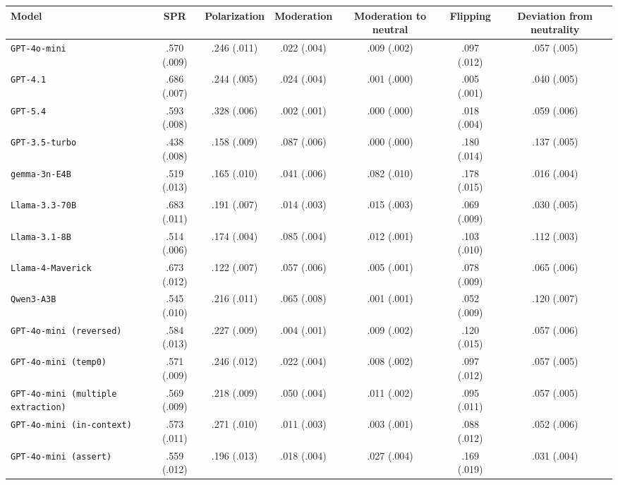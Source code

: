 \begin{tabular}{lcccccc}
		\\
		\hline
		Model & SPR & Polarization & Moderation & Moderation to neutral & Flipping & Deviation from neutrality \\
		\hline
		\texttt{GPT-4o-mini} & .570 (.009) & .246 (.011) & .022 (.004) & .009 (.002) & .097 (.012) & .057 (.005) \\
		\texttt{GPT-4.1} & .686 (.007) & .244 (.005) & .024 (.004) & .001 (.000) & .005 (.001) & .040 (.005) \\
		\texttt{GPT-5.4} & .593 (.008) & .328 (.006) & .002 (.001) & .000 (.000) & .018 (.004) & .059 (.006) \\
		\texttt{GPT-3.5-turbo} & .438 (.008) & .158 (.009) & .087 (.006) & .000 (.000) & .180 (.014) & .137 (.005) \\
		\texttt{gemma-3n-E4B} & .519 (.013) & .165 (.010) & .041 (.006) & .082 (.010) & .178 (.015) & .016 (.004) \\
		\texttt{Llama-3.3-70B} & .683 (.011) & .191 (.007) & .014 (.003) & .015 (.003) & .069 (.009) & .030 (.005) \\
		\texttt{Llama-3.1-8B} & .514 (.006) & .174 (.004) & .085 (.004) & .012 (.001) & .103 (.010) & .112 (.003) \\
		\texttt{Llama-4-Maverick} & .673 (.012) & .122 (.007) & .057 (.006) & .005 (.001) & .078 (.009) & .065 (.006) \\
		\texttt{Qwen3-A3B} & .545 (.010) & .216 (.011) & .065 (.008) & .001 (.001) & .052 (.009) & .120 (.007) \\
		\texttt{GPT-4o-mini (reversed)} & .584 (.013) & .227 (.009) & .004 (.001) & .009 (.002) & .120 (.015) & .057 (.006) \\
		\texttt{GPT-4o-mini (temp0)} & .571 (.009) & .246 (.012) & .022 (.004) & .008 (.002) & .097 (.012) & .057 (.005) \\
		\texttt{GPT-4o-mini (multiple extraction)} & .569 (.009) & .218 (.009) & .050 (.004) & .011 (.002) & .095 (.011) & .057 (.005) \\
		\texttt{GPT-4o-mini (in-context)} & .573 (.011) & .271 (.010) & .011 (.003) & .003 (.001) & .088 (.012) & .052 (.006) \\
		\texttt{GPT-4o-mini (assert)} & .559 (.012) & .196 (.013) & .018 (.004) & .027 (.004) & .169 (.019) & .031 (.004) \\

\end{tabular}
